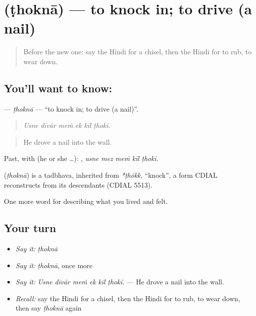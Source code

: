 \section[\texorpdfstring{\hi{ठोकना} (ṭhoknā)}{ठोकना (ṭhoknā)}]{ (ṭhoknā) — to knock in; to drive (a nail)}

\label{lesson:HI-C510-thokna}



\begin{quote}
Before the new one: say the Hindi for a chisel, then the Hindi for to rub, to wear down.
\end{quote}

\subsection*{You'll want to know: }
\textbf{} — \emph{ṭhoknā} — \textquotedblleft{}to knock in; to drive (a nail)\textquotedblright{}.

\begin{quote}
     
\end{quote}

\begin{quote}
\emph{Usne dīvār meṁ ek kīl ṭhokī.}
\end{quote}

\begin{quote}
He drove a nail into the wall.
\end{quote}

Past, with  (he or she …):     , \emph{usne mez meṁ kīl ṭhokī}.

\begin{cousinweb}
\textbf{} (\emph{ṭhoknā}) is a tadbhava, inherited from \emph{*ṭhōkk}, \textquotedblleft{}knock\textquotedblright{}, a form CDIAL reconstructs from its descendants (CDIAL 5513).
\end{cousinweb}

\begin{grammarlens}[title={What you've built}]
One more word for describing what you lived and felt.
\end{grammarlens}

\subsection*{Your turn}
\begin{itemize}
\raggedright
  \item \emph{Say it:} \emph{ṭhoknā}
  \item \emph{Say it:} \emph{ṭhoknā}, once more
  \item \emph{Say it:} \emph{Usne dīvār meṁ ek kīl ṭhokī.} — He drove a nail into the wall.
  \item \emph{Recall:} say the Hindi for a chisel, then the Hindi for to rub, to wear down, then say \emph{ṭhoknā} again
\end{itemize}

